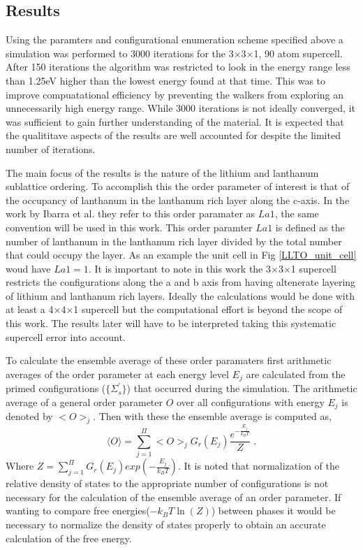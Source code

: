\documentclass[aps,pre,reprint,superscriptaddress,showkeys]{revtex4-1}
\begin{document}
\subsection{Results}
  Using the paramters and configurational enumeration scheme specified above a simulation was performed to 3000 iterations for  the 3$\times$3$\times$1,  90 atom supercell. After 150 iterations the algorithm was restricted to look  in the energy range less than 1.25eV higher than the lowest energy found at that time. This was to improve compuatational efficiency by preventing the walkers from exploring an unnecessarily high energy range. While 3000 iterations is not ideally converged, it was sufficient to gain further understanding of the material. It is expected that the qualititave aspects of the results are well accounted for despite the limited number of iterations. 
  
The main focus of the results is the nature of the lithium and lanthanum sublattice ordering. To accomplish this the order parameter of interest is that of the occupancy of lanthanum in the lanthanum rich layer along the c-axis.  In the work by Ibarra et al. \cite{P4mmmstrucuture} they refer to this order paramater as $La1$, the same convention will be used in this work. This order paramter $La1$ is defined as the number of lanthanum in the lanthanum rich layer divided by the total number that could occupy the layer. As an example the unit cell in Fig \ref{LLTO_unit_cell} woud have $La1=1$. It is important to note in this work the 3$\times$3$\times$1 supercell restricts the configurations along the a and b axis from having altenerate layering of lithium and lanthanum rich layers. Ideally the calculations would be done with at least a 4$\times$4$\times$1 supercell but the computational effort is beyond the scope of this work. The results later will have to be interpreted taking this systematic supercell error into account.  
  
To calculate the ensemble average of these order paramaters first arithmetic averages of the order parameter at each energy level $E_j$ are calculated from the primed configurations ($\{\Sigma_s ^{'}\}$) that occurred during the simulation. The arithmetic average of a general order parameter $O$ over all configurations with energy $E_j$ is denoted by $< O >_j$. Then with these the ensemble average is computed as, 
  \begin{equation}
  \langle O \rangle  =  \sum_{j=1}^{\Pi}< O >_j G_r(E_j) \frac{e^{-\frac{E_j}{k_BT}}}{Z} \;.
  \label{ensembleaverage}
  \end{equation}
  Where $Z= \sum_{j=1}^{\Pi} G_r(E_j) exp(-\frac{E_j}{k_BT})$. 
It is noted that normalization of the relative density of states to the appropriate number of configurations is not necessary for the calculation of the ensemble average of an order parameter. If wanting to compare free energies($-k_BT\ln(Z)$) between phases it would be necessary to normalize the density of states properly to obtain an accurate calculation of the free energy. 
\end{document}
